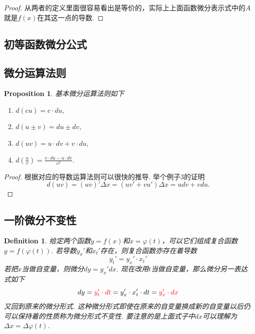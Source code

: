 \documentclass{article}
\newtheorem{proposition}[theorem]{Proposition}
\newtheorem{definition}[theorem]{Definition}
\begin{document}
\begin{proof}
{\color{blue}从两者的定义里面很容易看出是等价的，实际上上面函数微分表示式中的$A$就是$f(x)$在其这一点的导数}.
\end{proof}



\subsection{初等函数微分公式}


\subsection{微分运算法则}

\begin{proposition}
\rm 基本{\color{red}微分运算法则}如下
\begin{enumerate}
	\item $d(cu) = c\cdot du,$
	\item $d(u\pm v)= du \pm dv,$
	\item $d(uv) = u\cdot dv + v\cdot du,$
	\item $d(\frac{u}{v}) = \frac{v\cdot du - u \cdot dv}{v^2}.$
\end{enumerate}
\end{proposition}

\begin{proof}
{\color{blue}根据对应的导数运算法则可以很快的推导}. 举个例子3的证明
$$
d(uv) = (uv)'\Delta x = (uv'+vu')\Delta x = udv + vdu.
$$
\end{proof}

\subsection{一阶微分不变性}

\begin{definition}
\rm 给定两个函数$y = f(x)$和$x = \varphi(t)$，可以它们组成复合函数$y = f(\varphi(t))$. 若导数$y_x'$和$x_t'$存在，则复合函数亦存在着导数
$$
y_t' = y_x' \cdot x_t'
$$
若把$x$当做自变量，则微分$dy = y_x'dx$. 现在改用$t$当做自变量，那么微分另一表达式如下
$$
dy = {\color{red}y_t' \cdot dt} = y_x' \cdot x_t' \cdot dt = {\color{red}y_x' \cdot dx}
$$
又回到原来的微分形式. 这种微分形式即使在原来的自变量换成新的自变量以后仍可以保持着的性质称为{\color{red}微分形式不变性}. {\color{blue}要注意的是上面式子中$dx$可以理解为$\Delta x = \Delta \varphi(t)$}.
\end{definition}
\end{document}
